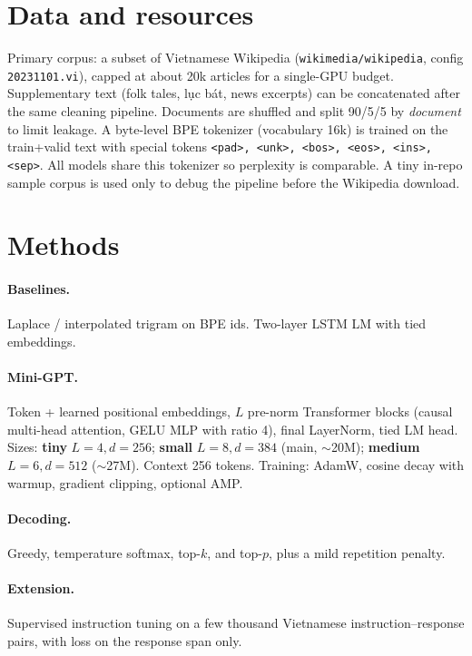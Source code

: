 \documentclass[11pt]{article}
\begin{document}
\section{Data and resources}

Primary corpus: a subset of Vietnamese Wikipedia (\texttt{wikimedia/wikipedia}, config \texttt{20231101.vi}), capped at about 20k articles for a single-GPU budget. Supplementary text (folk tales, lục bát, news excerpts) can be concatenated after the same cleaning pipeline. Documents are shuffled and split 90/5/5 by \emph{document} to limit leakage. A byte-level BPE tokenizer (vocabulary 16k) is trained on the train+valid text with special tokens \texttt{<pad>, <unk>, <bos>, <eos>, <ins>, <sep>}. All models share this tokenizer so perplexity is comparable. A tiny in-repo sample corpus is used only to debug the pipeline before the Wikipedia download.

\section{Methods}

\paragraph{Baselines.} Laplace / interpolated trigram on BPE ids. Two-layer LSTM LM with tied embeddings.

\paragraph{Mini-GPT.} Token + learned positional embeddings, $L$ pre-norm Transformer blocks (causal multi-head attention, GELU MLP with ratio 4), final LayerNorm, tied LM head. Sizes: \textbf{tiny} $L{=}4,d{=}256$; \textbf{small} $L{=}8,d{=}384$ (main, $\sim$20M); \textbf{medium} $L{=}6,d{=}512$ ($\sim$27M). Context 256 tokens. Training: AdamW, cosine decay with warmup, gradient clipping, optional AMP.

\paragraph{Decoding.} Greedy, temperature softmax, top-$k$, and top-$p$, plus a mild repetition penalty.

\paragraph{Extension.} Supervised instruction tuning on a few thousand Vietnamese instruction--response pairs, with loss on the response span only.
\end{document}
